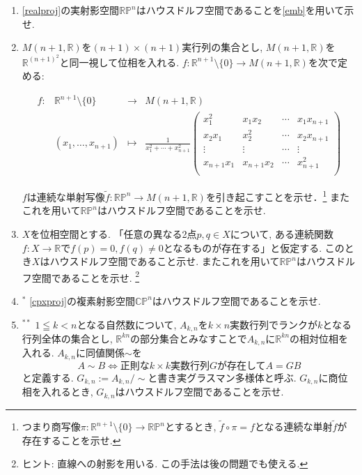 \documentclass[dvipdfmx,a4paper,11pt]{article}
\newcommand{\R}{\mathbb{R}}
\newcommand{\C}{\mathbb{C}}
\theoremstyle{definition}
\begin{document}
\begin{enumerate}[label=\textbf{問}\ref*{sec-Hausdorff}.\arabic*]
\item \ref{realproj}の実射影空間$\R\mathbb{P}^{n}$はハウスドルフ空間であることを\ref{emb}を用いて示せ. %

\item $M(n+1, \R)$を$(n+1) \times (n+1)$実行列の集合とし, $M(n+1, \R) $を$\R^{(n+1)^2}$と同一視して位相を入れる. 
$f: \R^{n+1} \setminus \{0\} \rightarrow  M(n+1, \R) $を次で定める:

$$
\begin{matrix}
f: & \R^{n+1} \setminus \{0\} &\rightarrow & M(n+1, \R) \\
&(x_1, \ldots, x_{n+1})&\mapsto & 
\frac{1}{x_{1}^{2} + \cdots + x_{n+1}^{2} }
 \begin{pmatrix}
 x_{1}^{2} & x_1x_2& \cdots&x_1x_{n+1} \\ 
x_2x_1& x_{2}^{2}& \cdots&x_2x_{n+1} \\ 
\vdots &\vdots& \cdots& \vdots \\ 
x_{n+1}x_1&  x_{n+1}x_2& \cdots&x_{n+1}^{2} \\ 
\end{pmatrix}
\end{matrix}
$$


 $f$は連続な単射写像$\widetilde{f} : \R\mathbb{P}^{n} \rightarrow M(n+1, \R)$を引き起こすことを示せ．\footnote{つまり商写像$\pi : \R^{n+1} \setminus \{0\}  \to \R\mathbb{P}^{n}$とするとき, $\widetilde{f} \circ \pi = f$となる連続な単射$\widetilde{f}$が存在することを示せ.}
 またこれを用いて$\R\mathbb{P}^{n}$はハウスドルフ空間であることを示せ. 
 
\item $X$を位相空間とする. 「任意の異なる2点$p, q \in X$について, ある連続関数$f : X \rightarrow \R$で$f(p)=0, f(q)\neq 0$となるものが存在する」と仮定する. このとき$X$はハウスドルフ空間であること示せ. またこれを用いて$\R\mathbb{P}^{n}$はハウスドルフ空間であることを示せ. \footnote{ヒント: 直線への射影を用いる. この手法は後の問題でも使える.}
  

\item $^{*}$
	\ref{cpxproj}の複素射影空間$\C\mathbb{P}^{n}$はハウスドルフ空間であることを示せ.

\item $^{**}$ $1 \leqq k < n$となる自然数について, 
$A_{k, n}$を$k \times n$実数行列でランクが$k$となる行列全体の集合とし, $\R^{kn}$の部分集合とみなすことで$A_{k,n}$に$\R^{kn}$の相対位相を入れる. 
$A_{k, n}$に同値関係$\sim$を
$$
	A \sim B \Leftrightarrow \text{正則な$k \times k$実数行列$G$が存在して$A = GB$}
$$
と定義する. $G_{k,n}:= A_{k, n}/\sim$と書き実グラスマン多様体と呼ぶ. $G_{k,n}$に商位相を入れるとき, $G_{k,n}$はハウスドルフ空間であることを示せ. 


\end{enumerate}
\end{document}
